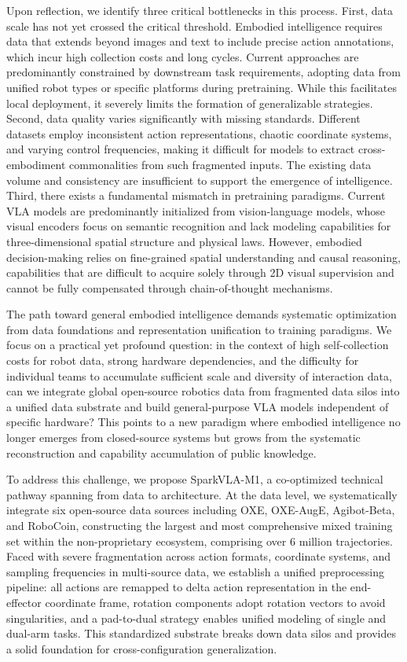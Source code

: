 \documentclass[11pt,a4paper]{article}
\begin{document}
Upon reflection, we identify three critical bottlenecks in this process. First, data scale has not yet crossed the critical threshold. Embodied intelligence requires data that extends beyond images and text to include precise action annotations, which incur high collection costs and long cycles. Current approaches are predominantly constrained by downstream task requirements, adopting data from unified robot types or specific platforms during pretraining. While this facilitates local deployment, it severely limits the formation of generalizable strategies. Second, data quality varies significantly with missing standards. Different datasets employ inconsistent action representations, chaotic coordinate systems, and varying control frequencies, making it difficult for models to extract cross-embodiment commonalities from such fragmented inputs. The existing data volume and consistency are insufficient to support the emergence of intelligence. Third, there exists a fundamental mismatch in pretraining paradigms. Current VLA models are predominantly initialized from vision-language models, whose visual encoders focus on semantic recognition and lack modeling capabilities for three-dimensional spatial structure and physical laws. However, embodied decision-making relies on fine-grained spatial understanding and causal reasoning, capabilities that are difficult to acquire solely through 2D visual supervision and cannot be fully compensated through chain-of-thought mechanisms.

The path toward general embodied intelligence demands systematic optimization from data foundations and representation unification to training paradigms. We focus on a practical yet profound question: in the context of high self-collection costs for robot data, strong hardware dependencies, and the difficulty for individual teams to accumulate sufficient scale and diversity of interaction data, can we integrate global open-source robotics data from fragmented data silos into a unified data substrate and build general-purpose VLA models independent of specific hardware? This points to a new paradigm where embodied intelligence no longer emerges from closed-source systems but grows from the systematic reconstruction and capability accumulation of public knowledge.

To address this challenge, we propose SparkVLA-M1, a co-optimized technical pathway spanning from data to architecture. At the data level, we systematically integrate six open-source data sources including OXE, OXE-AugE, Agibot-Beta, and RoboCoin, constructing the largest and most comprehensive mixed training set within the non-proprietary ecosystem, comprising over 6 million trajectories. Faced with severe fragmentation across action formats, coordinate systems, and sampling frequencies in multi-source data, we establish a unified preprocessing pipeline: all actions are remapped to delta action representation in the end-effector coordinate frame, rotation components adopt rotation vectors to avoid singularities, and a pad-to-dual strategy enables unified modeling of single and dual-arm tasks. This standardized substrate breaks down data silos and provides a solid foundation for cross-configuration generalization.
\end{document}
